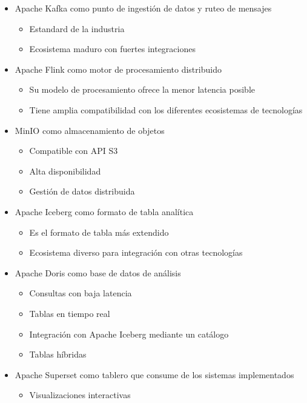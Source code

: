 \begin{itemize}
    \item Apache Kafka como punto de ingestión de datos y ruteo de mensajes
       \begin{itemize}
           \item Estandard de la industria
           \item Ecosistema maduro con fuertes integraciones
       \end{itemize}
    \item Apache Flink como motor de procesamiento distribuido
       \begin{itemize}
           \item Su modelo de procesamiento ofrece la menor latencia posible
           \item Tiene amplia compatibilidad con los diferentes ecosistemas de tecnologías
       \end{itemize}
    \item MinIO como almacenamiento de objetos
       \begin{itemize}
           \item Compatible con API S3
           \item Alta disponibilidad
           \item Gestión de datos distribuida
       \end{itemize}
    \item Apache Iceberg como formato de tabla analítica
       \begin{itemize}
           \item Es el formato de tabla más extendido
           \item Ecosistema diverso para integración con otras tecnologías
       \end{itemize}
    \item Apache Doris como base de datos de análisis
       \begin{itemize}
           \item Consultas con baja latencia
           \item Tablas en tiempo real
           \item Integración con Apache Iceberg mediante un catálogo
           \item Tablas híbridas
       \end{itemize}
    \item Apache Superset como tablero que consume de los sistemas implementados
       \begin{itemize}
           \item Visualizaciones interactivas

\end{itemize}
\end{itemize}
